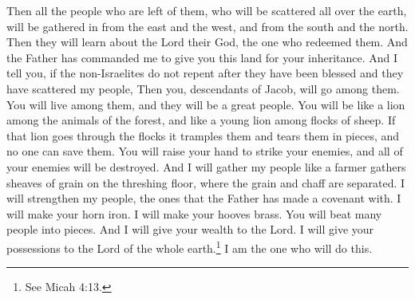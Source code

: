Then all the people who are left of them, who will be scattered all over the earth, will be gathered in from the east and the west, and from the south and the north. Then they will learn about the Lord their God, the one who redeemed them.
\bverse \iffalse And the Father hath commanded me that I should give unto you this land, for your inheritance. \fi
And the Father has commanded me to give you this land for your inheritance.
\bverse \iffalse And I say unto you, that if the Gentiles do not repent after the blessing which they shall receive, after they have scattered my people-- \fi
And I tell you, if the non-Israelites do not repent after they have been blessed and they have scattered my people,
\bverse \iffalse Then shall ye, who are a remnant of the house of Jacob, go forth among them; and ye shall be in the midst of them who shall be many; and ye shall be among them as a lion among the beasts of the forest, and as a young lion among the flocks of sheep, who, if he goeth through both treadeth down and teareth in pieces, and none can deliver. \fi
Then you, descendants of Jacob, will go among them. You will live among them, and they will be a great people. You will be like a lion among the animals of the forest, and like a young lion among flocks of sheep. If that lion goes through the flocks it tramples them and tears them in pieces, and no one can save them.
\bverse \iffalse Thy hand shall be lifted up upon thine adversaries, and all thine enemies shall be cut off. \fi
You will raise your hand to strike your enemies, and all of your enemies will be destroyed.
\bverse \iffalse And I will gather my people together as a man gathereth his sheaves into the floor. \fi
And I will gather my people like a farmer gathers sheaves of grain on the threshing floor, where the grain and chaff are separated.
\bverse \iffalse For I will make my people with whom the Father hath covenanted, yea, I will make thy horn iron, and I will make thy hoofs brass. And thou shalt beat in pieces many people; and I will consecrate their gain unto the Lord, and their substance unto the Lord of the whole earth. And behold, I am he who doeth it. \fi
I will strengthen my people, the ones that the Father has made a covenant with. I will make your horn iron. I will make your hooves brass. You will beat many people into pieces. And I will give your wealth to the Lord. I will give your possessions to the Lord of the whole earth.\footnote{See Micah 4:13.} I am the one who will do this.
\bverse \iffalse And it shall come to pass, saith the Father, that the sword of my justice shall hang over them at that day; and except they repent it shall fall upon them, saith the Father, yea, even upon all the nations of the Gentiles. \fi
